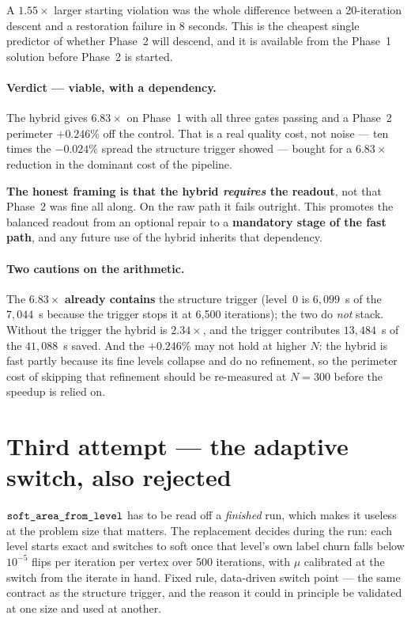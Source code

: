 \documentclass[11pt,a4paper]{article}
\begin{document}
A \(1.55\times\) larger starting violation was the whole difference between a
20-iteration descent and a restoration failure in 8 seconds. This is the
cheapest single predictor of whether Phase~2 will descend, and it is available
from the Phase~1 solution before Phase~2 is started.

\paragraph{Verdict --- viable, with a dependency.} The hybrid gives
\(\mathbf{6.83\times}\) on Phase~1 with all three gates passing and a Phase~2
perimeter \(+0.246\%\) off the control. That is a real quality cost, not noise
--- ten times the \(-0.024\%\) spread the structure trigger showed --- bought
for a \(6.83\times\) reduction in the dominant cost of the pipeline.

\textbf{The honest framing is that the hybrid \emph{requires} the readout},
not that Phase~2 was fine all along. On the raw path it fails outright. This
promotes the balanced readout from an optional repair to a \textbf{mandatory
stage of the fast path}, and any future use of the hybrid inherits that
dependency.

\paragraph{Two cautions on the arithmetic.} The \(6.83\times\)
\textbf{already contains} the structure trigger (level~0 is \(6{,}099\)~s of the
\(7{,}044\)~s because the trigger stops it at 6{,}500 iterations); the two do
\emph{not} stack. Without the trigger the hybrid is \(2.34\times\), and the
trigger contributes \(13{,}484\)~s of the \(41{,}088\)~s saved. And the
\(+0.246\%\) may not hold at higher \(N\): the hybrid is fast partly because its
fine levels collapse and do no refinement, so the perimeter cost of skipping
that refinement should be re-measured at \(N{=}300\) before the speedup is
relied on.

\section{Third attempt --- the adaptive switch, also rejected}
\label{sec:adaptive}

\(\texttt{soft\_area\_from\_level}\) has to be read off a \emph{finished} run,
which makes it useless at the problem size that matters. The replacement decides
during the run: each level starts exact and switches to soft once that level's
own label churn falls below \(10^{-5}\) flips per iteration per vertex over 500
iterations, with \(\mu\) calibrated at the switch from the iterate in hand. Fixed
rule, data-driven switch point --- the same contract as the structure trigger,
and the reason it could in principle be validated at one size and used at
another.
\end{document}
